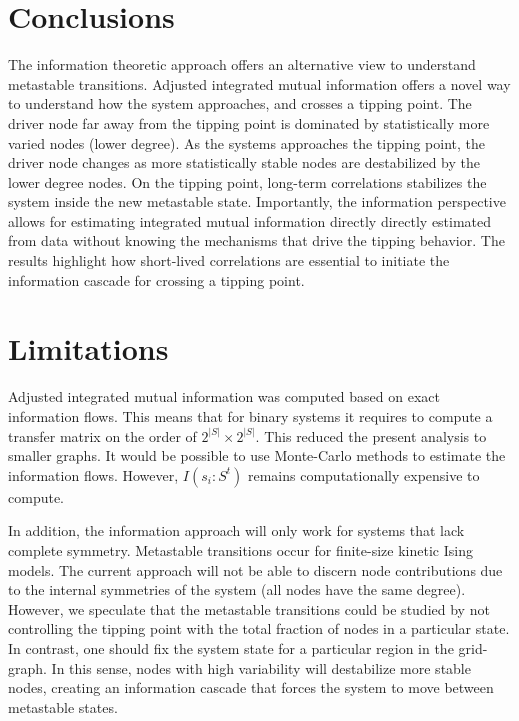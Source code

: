 \documentclass[a4paper, 11pt, twocolumn]{article}
\begin{document}
\section{Conclusions}
\label{sec:org7971cd6}
The  information theoretic  approach  offers an  alternative
view   to   understand  metastable   transitions.   Adjusted
integrated  mutual   information  offers  a  novel   way  to
understand how the system  approaches, and crosses a tipping
point. The  driver node far  away from the tipping  point is
dominated by statistically more varied nodes (lower degree).
As the systems approaches the tipping point, the driver node
changes as more statistically  stable nodes are destabilized
by the lower  degree nodes. On the  tipping point, long-term
correlations stabilizes the system inside the new metastable
state. Importantly,  the information perspective  allows for
estimating integrated  mutual information  directly directly
estimated  from data  without  knowing  the mechanisms  that
drive  the  tipping  behavior.  The  results  highlight  how
short-lived  correlations  are  essential  to  initiate  the
information cascade for crossing a tipping point.

\section{Limitations}
\label{sec:org26f073f}
Adjusted integrated mutual information was computed based on
exact information flows. This  means that for binary systems
it requires  to compute  a transfer matrix  on the  order of
$2^{|S|} \times  2^{|S|}$. This  reduced the present  analysis to
smaller  graphs. It  would  be possible  to use  Monte-Carlo
methods to estimate the information flows. However, $I(s_i :
S^t)$ remains computationally expensive to compute.

In  addition, the  information approach  will only  work for
systems that lack  complete symmetry. Metastable transitions
occur  for finite-size  kinetic  Ising  models. The  current
approach will not be able  to discern node contributions due
to the internal symmetries of the system (all nodes have the
same  degree). However,  we  speculate  that the  metastable
transitions could be studied  by not controlling the tipping
point  with the  total  fraction of  nodes  in a  particular
state. In  contrast, one should  fix the system state  for a
particular region  in the  grid-graph. In this  sense, nodes
with high  variability will  destabilize more  stable nodes,
creating an  information cascade  that forces the  system to
move between metastable states.
\end{document}
